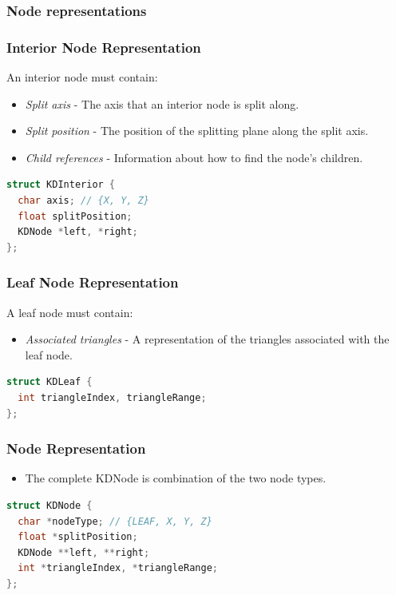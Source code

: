 \documentclass{beamer}
\begin{document}
\subsubsection{Node representations}
\begin{frame}[fragile]
  \frametitle{Interior Node Representation}
  An interior node must contain:
  \begin{itemize}
  \item \textit{Split axis} - The axis that an interior node is split
    along.
  \item \textit{Split position} - The position of the splitting plane
    along the split axis.
  \item \textit{Child references} - Information about how to find the
    node's children.
  \end{itemize}

  \begin{lstlisting}[language=C++]
struct KDInterior {
  char axis; // {X, Y, Z}
  float splitPosition;
  KDNode *left, *right;
};
  \end{lstlisting}
\end{frame}

\begin{frame}[fragile]
  \frametitle{Leaf Node Representation}
  A leaf node must contain:
  \begin{itemize}
    \item \textit{Associated triangles} - A representation of the triangles
      associated with the leaf node.
  \end{itemize}
  \begin{lstlisting}[language=C++]
struct KDLeaf {
  int triangleIndex, triangleRange;
};
  \end{lstlisting}
\end{frame}

\begin{frame}[fragile]
  \frametitle{Node Representation}
  \begin{itemize}
  \item The complete KDNode is combination of the two node types.
  \end{itemize}
  
  \begin{lstlisting}[language=C++]
struct KDNode {
  char *nodeType; // {LEAF, X, Y, Z}
  float *splitPosition;
  KDNode **left, **right;
  int *triangleIndex, *triangleRange;
};
  \end{lstlisting}
\end{frame}
\end{document}
